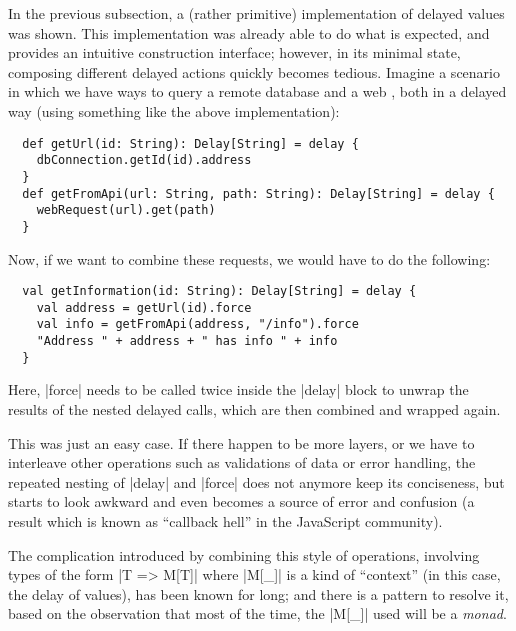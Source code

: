 In the previous subsection, a (rather primitive) implementation of delayed values was shown. This
implementation was already able to do what is expected, and provides an intuitive construction
interface; however, in its minimal state, composing different delayed actions quickly becomes
tedious. Imagine a scenario in which we have ways to query a remote database and a web ,
both in a delayed way (using something like the above implementation):
\begin{lstlisting}
  def getUrl(id: String): Delay[String] = delay {
    dbConnection.getId(id).address
  }
  def getFromApi(url: String, path: String): Delay[String] = delay {
    webRequest(url).get(path)
  }
\end{lstlisting}
Now, if we want to combine these requests, we would have to do the following:
\begin{lstlisting}
  val getInformation(id: String): Delay[String] = delay {
    val address = getUrl(id).force
    val info = getFromApi(address, "/info").force
    "Address " + address + " has info " + info
  }
\end{lstlisting}
Here, |force| needs to be called twice inside the |delay| block to unwrap the results of the nested
delayed calls, which are then combined and wrapped again.

This was just an easy case. If there happen to be more layers, or we have to interleave other
operations such as validations of data or error handling, the repeated nesting of |delay| and
|force| does not anymore keep its conciseness, but starts to look awkward and even becomes a source
of error and confusion (a result which is known as \enquote{callback hell} in the JavaScript
community).

The complication introduced by combining this style of operations, involving types of the form %
|T => M[T]| where |M[_]| is a kind of \enquote{context} (in this case, the delay of values), has
been known for long; and there is a pattern to resolve it, based on the observation that most of the
time, the |M[_]| used will be a \emph{monad}.

